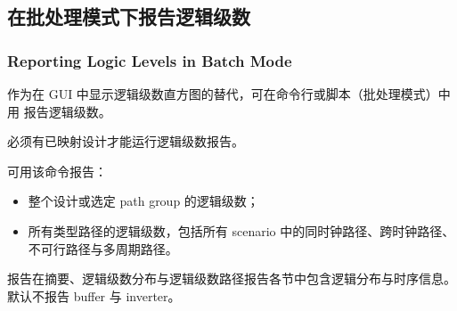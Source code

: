 \subsection{在批处理模式下报告逻辑级数}
\subsubsection*{Reporting Logic Levels in Batch Mode}

作为在 GUI 中显示逻辑级数直方图的替代，可在命令行或脚本（批处理模式）中用  报告逻辑级数。

\begin{noteBox}
必须有已映射设计才能运行逻辑级数报告。
\end{noteBox}

可用该命令报告：
\begin{itemize}
  \item 整个设计或选定 path group 的逻辑级数；
  \item 所有类型路径的逻辑级数，包括所有 scenario 中的同时钟路径、跨时钟路径、不可行路径与多周期路径。
\end{itemize}

报告在摘要、逻辑级数分布与逻辑级数路径报告各节中包含逻辑分布与时序信息。默认不报告 buffer 与 inverter。

